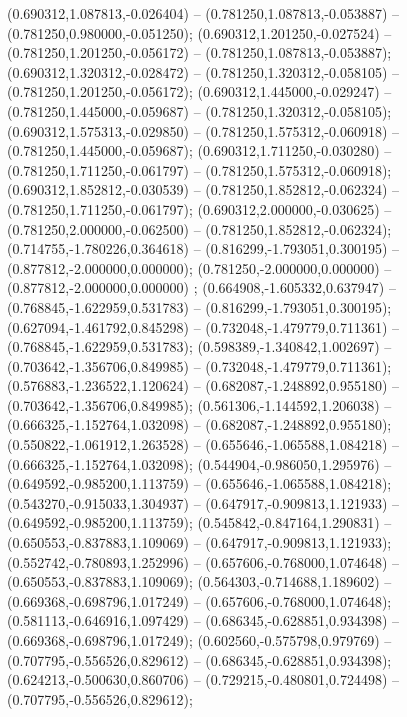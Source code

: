  (0.690312,1.087813,-0.026404) -- (0.781250,1.087813,-0.053887) -- (0.781250,0.980000,-0.051250);
 (0.690312,1.201250,-0.027524) -- (0.781250,1.201250,-0.056172) -- (0.781250,1.087813,-0.053887);
 (0.690312,1.320312,-0.028472) -- (0.781250,1.320312,-0.058105) -- (0.781250,1.201250,-0.056172);
 (0.690312,1.445000,-0.029247) -- (0.781250,1.445000,-0.059687) -- (0.781250,1.320312,-0.058105);
 (0.690312,1.575313,-0.029850) -- (0.781250,1.575312,-0.060918) -- (0.781250,1.445000,-0.059687);
 (0.690312,1.711250,-0.030280) -- (0.781250,1.711250,-0.061797) -- (0.781250,1.575312,-0.060918);
 (0.690312,1.852812,-0.030539) -- (0.781250,1.852812,-0.062324) -- (0.781250,1.711250,-0.061797);
 (0.690312,2.000000,-0.030625) -- (0.781250,2.000000,-0.062500) -- (0.781250,1.852812,-0.062324);
 (0.714755,-1.780226,0.364618) -- (0.816299,-1.793051,0.300195) -- (0.877812,-2.000000,0.000000);
 (0.781250,-2.000000,0.000000) -- (0.877812,-2.000000,0.000000) ;
 (0.664908,-1.605332,0.637947) -- (0.768845,-1.622959,0.531783) -- (0.816299,-1.793051,0.300195);
 (0.627094,-1.461792,0.845298) -- (0.732048,-1.479779,0.711361) -- (0.768845,-1.622959,0.531783);
 (0.598389,-1.340842,1.002697) -- (0.703642,-1.356706,0.849985) -- (0.732048,-1.479779,0.711361);
 (0.576883,-1.236522,1.120624) -- (0.682087,-1.248892,0.955180) -- (0.703642,-1.356706,0.849985);
 (0.561306,-1.144592,1.206038) -- (0.666325,-1.152764,1.032098) -- (0.682087,-1.248892,0.955180);
 (0.550822,-1.061912,1.263528) -- (0.655646,-1.065588,1.084218) -- (0.666325,-1.152764,1.032098);
 (0.544904,-0.986050,1.295976) -- (0.649592,-0.985200,1.113759) -- (0.655646,-1.065588,1.084218);
 (0.543270,-0.915033,1.304937) -- (0.647917,-0.909813,1.121933) -- (0.649592,-0.985200,1.113759);
 (0.545842,-0.847164,1.290831) -- (0.650553,-0.837883,1.109069) -- (0.647917,-0.909813,1.121933);
 (0.552742,-0.780893,1.252996) -- (0.657606,-0.768000,1.074648) -- (0.650553,-0.837883,1.109069);
 (0.564303,-0.714688,1.189602) -- (0.669368,-0.698796,1.017249) -- (0.657606,-0.768000,1.074648);
 (0.581113,-0.646916,1.097429) -- (0.686345,-0.628851,0.934398) -- (0.669368,-0.698796,1.017249);
 (0.602560,-0.575798,0.979769) -- (0.707795,-0.556526,0.829612) -- (0.686345,-0.628851,0.934398);
 (0.624213,-0.500630,0.860706) -- (0.729215,-0.480801,0.724498) -- (0.707795,-0.556526,0.829612);
